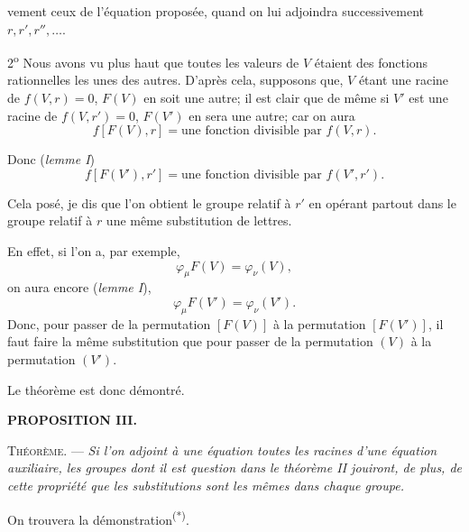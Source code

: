 
vement ceux de l'équation proposée, quand on lui adjoindra successivement
$r,r',r'',\ldots$.

2\textsuperscript{o} Nous avons vu plus haut que toutes les valeurs de $V$ étaient
des fonctions rationnelles les unes des autres. D'après cela, supposons
que, $V$ étant une racine de $f(V,r)=0$, $F(V)$ en soit une
autre; il est clair que de même si $V'$ est une racine de $f(V,r')=0$,
$F(V')$ en sera une autre; car on aura
\[
f[F(V),r]=\text{une fonction divisible par }f(V,r).
\]

Donc (\emph{lemme I})
\[
f[F(V'),r']=\text{une fonction divisible par }f(V',r').
\]

Cela posé, je dis que l'on obtient le groupe relatif à $r'$ en opérant
partout dans le groupe relatif à $r$ une même substitution de
lettres.

En effet, si l'on a, par exemple,
\[
\varphi_{\mu}F(V)=\varphi_{\nu}(V),
\]
on aura encore (\emph{lemme I}),
\[
\varphi_{\mu}F(V')=\varphi_{\nu}(V').
\]
Donc, pour passer de la permutation $[F(V)]$ à la permutation
$[F(V')]$, il faut faire la même substitution que pour passer de la
permutation $(V)$ à la permutation $(V')$.

Le théorème est donc démontré.

\begin{center}{\bfseries PROPOSITION III.}\end{center}

\noindent\textsc{Théorème.} --- \emph{Si l'on adjoint à une équation toutes les racines
d'une équation auxiliaire, les groupes dont il est question
dans le théorème II jouiront, de plus, de cette propriété que
les substitutions sont les mêmes dans chaque groupe.}

On trouvera la démonstration\textsuperscript{(*)}.

